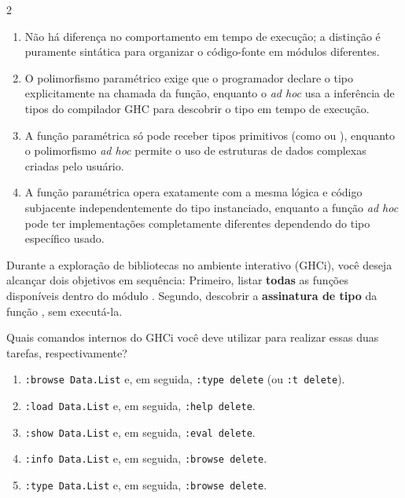 \documentclass[a4paper,10pt,brazil]{article}
\begin{document}
\begin{multicols}{2}
\begin{enumerate}
  \item Não há diferença no comportamento em tempo de execução; a distinção é puramente sintática para organizar o código-fonte em módulos diferentes.

  \item O polimorfismo paramétrico exige que o programador declare o tipo explicitamente na chamada da função, enquanto o \emph{ad hoc} usa a inferência de tipos do compilador GHC para descobrir o tipo em tempo de execução.

  \item A função paramétrica só pode receber tipos primitivos (como  ou ), enquanto o polimorfismo \emph{ad hoc} permite o uso de estruturas de dados complexas criadas pelo usuário.

  \item A função paramétrica opera exatamente com a mesma lógica e código subjacente independentemente do tipo instanciado, enquanto a função \emph{ad hoc} pode ter implementações completamente diferentes dependendo do tipo específico usado.


\end{enumerate}

Durante a exploração de bibliotecas no ambiente interativo (GHCi), você deseja alcançar dois objetivos em sequência:
Primeiro, listar \textbf{todas} as funções disponíveis dentro do módulo .
Segundo, descobrir a \textbf{assinatura de tipo} da função , sem executá-la.

Quais comandos internos do GHCi você deve utilizar para realizar essas duas tarefas, respectivamente?

\begin{enumerate}
  \item \texttt{:browse Data.List} e, em seguida, \texttt{:type delete} (ou \texttt{:t delete}).

  \item \texttt{:load Data.List} e, em seguida, \texttt{:help delete}.

  \item \texttt{:show Data.List} e, em seguida, \texttt{:eval delete}.

  \item \texttt{:info Data.List} e, em seguida, \texttt{:browse delete}.

  \item \texttt{:type Data.List} e, em seguida, \texttt{:browse delete}.



\end{enumerate}
\end{multicols}
\end{document}
